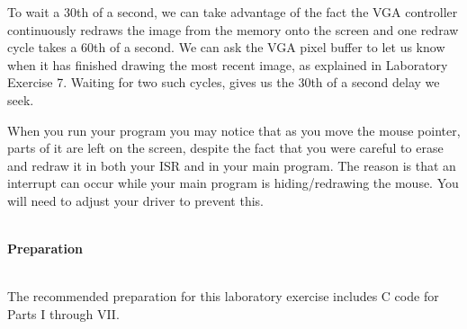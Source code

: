 \documentclass[epsfig,10pt,fullpage]{article}
\newcommand{\CommonDocsPath}{../../../../common/docs}
\begin{document}
To wait a 30th of a second, we can take advantage of the fact the VGA controller continuously redraws the image from the memory
onto the screen and one redraw cycle takes a 60th of a second. We can ask the VGA pixel buffer to let us know when it has finished drawing the most recent image, as explained in Laboratory Exercise 7. Waiting for two such cycles, gives us the 30th of a second delay we seek.

When you run your program you may notice that as you move the mouse pointer, parts of it are left on the screen, despite the fact that you were careful to erase and redraw it in both your ISR and in your main program. The reason is that an interrupt can occur while your main program is hiding/redrawing the mouse. You will need to adjust your driver to prevent this.

~\\
\noindent
{\bf Preparation}

~\\
\noindent
The recommended preparation for this laboratory exercise includes C code for Parts I through VII.



\end{document}
